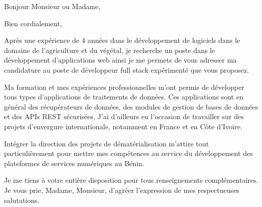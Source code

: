 \documentclass[20pt,a4paper,sans]{moderncv}
\begin{document}
\address{3, allée de la roselière, 91410 Dourdan FRANCE}
\date{Mercredi, le 06 mai 2020}
\opening{Bonjour Monsieur ou Madame,}
\closing{Bien cordialement,}
\makelettertitle

\vskip 3.5mm

\newline
Après une expérience de 4 années dans le développement de logiciels dans le domaine de l'agriculture et du végétal, je recherche un poste dans le développement d'applications web ainsi je me permets de vous adresser ma candidature au poste de développeur full stack expérimenté que vous proposez.\\
\vskip 3.5mm

\newline
Ma formation et mes expériences professionnelles m'ont permis de développer tous types d'applications de traitements de données. Ces applications sont en général des récupérateurs de données, des modules de gestion de bases de données et des APIs REST sécurisées. J'ai d'ailleurs eu l'occasion de travailler sur des projets d'envergure internationale, notamment en France et en Côte d'Ivoire.\\
\vskip 3.5mm

\newline
Intégrer la direction des projets de dématérialisation m'attire tout particulièrement pour mettre mes compétences au service du développement des plateformes de services numériques au Bénin.\\
\vskip 3.5mm

\newline
Je me tiens à votre entière disposition pour tous renseignements complémentaires. Je vous prie, Madame, Monsieur, d'agréer l'expression de mes respectueuses salutations.\\
\vskip 3.5mm

\makeletterclosing
\end{document}
